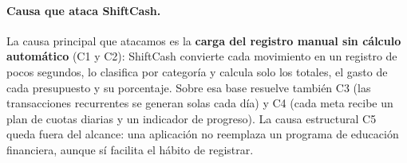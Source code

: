 \paragraph{Causa que ataca ShiftCash.} La causa principal que atacamos es la \textbf{carga del registro manual sin cálculo automático} (C1 y C2): ShiftCash convierte cada movimiento en un registro de pocos segundos, lo clasifica por categoría y calcula solo los totales, el gasto de cada presupuesto y su porcentaje. Sobre esa base resuelve también C3 (las transacciones recurrentes se generan solas cada día) y C4 (cada meta recibe un plan de cuotas diarias y un indicador de progreso). La causa estructural C5 queda fuera del alcance: una aplicación no reemplaza un programa de educación financiera, aunque sí facilita el hábito de registrar.
